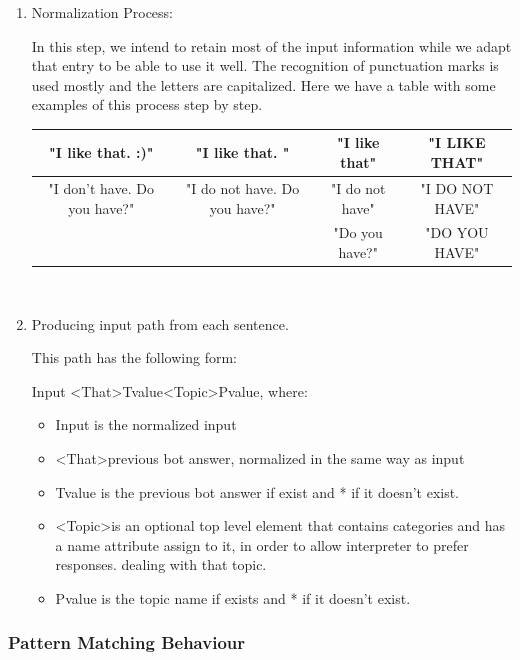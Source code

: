\documentclass[12pt,twoside]{article}
\theoremstyle{plain}
\theoremstyle{definition}
\theoremstyle{remark}
\begin{document}
	\begin{enumerate}
		\item Normalization Process:
		
		In this step, we intend to retain most of the input information while we adapt that entry to be able to use it well. The recognition of punctuation marks is used mostly and the letters are capitalized. Here we have a table with some examples of this process step by step. \\
		
		\begin{tabular}{|c|c|c|c|}
			\hline
			 "I like that. :)" & "I like that. " & "I like that" & "I LIKE THAT" \\
			\hline
			\scriptsize{"I don't have. Do you have?"}  & \scriptsize{"I do not have. Do you have?"} & \scriptsize{"I do not have"} & \scriptsize{"I DO NOT HAVE"}\\  &  & \scriptsize{"Do you have?"} & \scriptsize{"DO YOU HAVE"}\\
			\hline
		\end{tabular}\\
		
		\newpage
		
		\item Producing input path from each sentence.
		
		This path has the following form:
		
		Input \textless That\textgreater Tvalue\textless Topic\textgreater Pvalue,  where:
		
			\begin{itemize}
			
			\item Input is the normalized input
			\item \textless That\textgreater previous bot answer, normalized in the same way as input
			\item Tvalue is the previous bot answer if exist and * if it doesn't exist.
			\item \textless Topic\textgreater is an optional top level element that contains categories and has a name attribute assign to it, in order to allow interpreter to prefer responses.
dealing with that topic.
			\item Pvalue is the topic name if exists and * if it doesn't exist.
			\end{itemize}
	\end{enumerate}
	
\subsubsection{Pattern Matching Behaviour}
	\label{sec:match}
	
\end{document}
